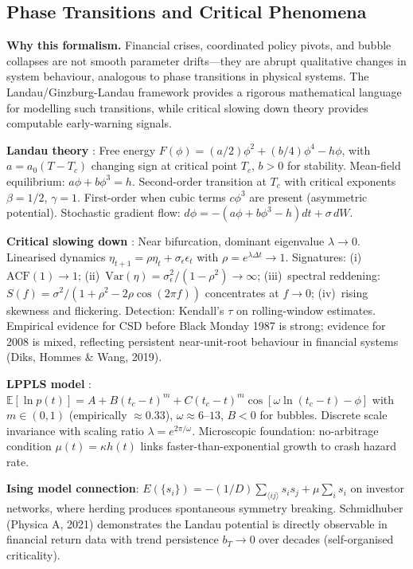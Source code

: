 \documentclass[11pt,a4paper]{article}
\theoremstyle{definition}
\newcommand{\E}{\mathbb{E}}
\newcommand{\Var}{\mathrm{Var}}
\begin{document}
\begin{appendices}
\section{Phase Transitions and Critical Phenomena}
\label{app:phase_transitions}

\textbf{Why this formalism.} Financial crises, coordinated policy pivots, and bubble collapses are not smooth parameter drifts---they are abrupt qualitative changes in system behaviour, analogous to phase transitions in physical systems. The Landau/Ginzburg-Landau framework provides a rigorous mathematical language for modelling such transitions, while critical slowing down theory provides computable early-warning signals.

\textbf{Landau theory} \citep{landau1937theory}: Free energy $F(\phi) = (a/2)\phi^2 + (b/4)\phi^4 - h\phi$, with $a = a_0(T-T_c)$ changing sign at critical point $T_c$, $b > 0$ for stability. Mean-field equilibrium: $a\phi + b\phi^3 = h$. Second-order transition at $T_c$ with critical exponents $\beta = 1/2$, $\gamma = 1$. First-order when cubic terms $c\phi^3$ are present (asymmetric potential). Stochastic gradient flow: $d\phi = -(a\phi + b\phi^3 - h)dt + \sigma\,dW$.

\textbf{Critical slowing down} \citep{scheffer2009early,dakos2012methods}: Near bifurcation, dominant eigenvalue $\lambda \to 0$. Linearised dynamics $\eta_{t+1} = \rho\eta_t + \sigma_\epsilon\epsilon_t$ with $\rho = e^{\lambda\Delta t} \to 1$. Signatures: (i)~$\mathrm{ACF}(1) \to 1$; (ii)~$\Var(\eta) = \sigma_\epsilon^2/(1-\rho^2) \to \infty$; (iii)~spectral reddening: $S(f) = \sigma^2/(1+\rho^2-2\rho\cos(2\pi f))$ concentrates at $f \to 0$; (iv)~rising skewness and flickering. Detection: Kendall's $\tau$ on rolling-window estimates. Empirical evidence for CSD before Black Monday 1987 is strong; evidence for 2008 is mixed, reflecting persistent near-unit-root behaviour in financial systems (Diks, Hommes \& Wang, 2019).

\textbf{LPPLS model} \citep{sornette2003critical}: $\E[\ln p(t)] = A + B(t_c-t)^m + C(t_c-t)^m\cos[\omega\ln(t_c-t)-\phi]$ with $m \in (0,1)$ (empirically $\approx 0.33$), $\omega \approx 6$--$13$, $B < 0$ for bubbles. Discrete scale invariance with scaling ratio $\lambda = e^{2\pi/\omega}$. Microscopic foundation: no-arbitrage condition $\mu(t) = \kappa h(t)$ links faster-than-exponential growth to crash hazard rate.

\textbf{Ising model connection}: $E(\{s_i\}) = -(1/D)\sum_{\langle ij\rangle} s_is_j + \mu\sum_i s_i$ on investor networks, where herding produces spontaneous symmetry breaking. Schmidhuber (Physica A, 2021) demonstrates the Landau potential is directly observable in financial return data with trend persistence $b_T \to 0$ over decades (self-organised criticality).


\end{appendices}
\end{document}
